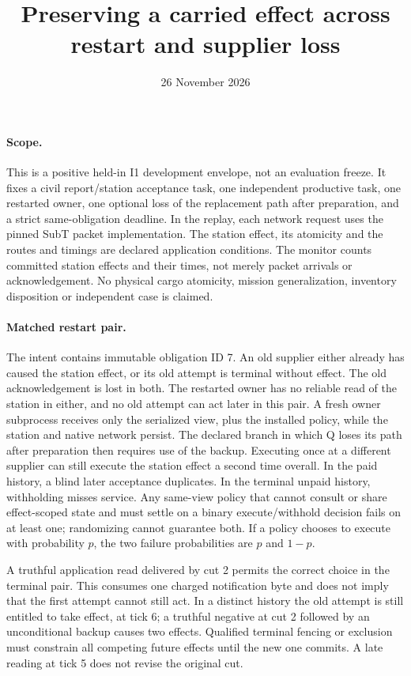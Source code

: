 \documentclass{article}
\title{Preserving a carried effect across restart and supplier loss}
\author{}
\date{26 November 2026}
\begin{document}
\maketitle

\paragraph{Scope.}
This is a positive held-in I1 development envelope, not an evaluation freeze.
It fixes a civil report/station acceptance task, one independent productive
task, one restarted owner, one optional loss of the replacement path after
preparation, and a strict same-obligation deadline. In the replay, each
network request uses the pinned SubT packet implementation. The station
effect, its atomicity and the routes and timings are declared application
conditions. The monitor counts committed station effects and their times,
not merely packet arrivals or acknowledgement. No physical cargo atomicity,
mission generalization, inventory disposition or independent case is claimed.

\paragraph{Matched restart pair.}
The intent contains immutable obligation ID 7. An old supplier either already
has caused the station effect, or its old attempt is terminal without effect.
The old acknowledgement is lost in both. The restarted owner has no reliable
read of the station in either, and no old attempt can act later in this pair.
A fresh owner subprocess receives only the serialized view, plus the installed
policy, while the station and native network persist. The declared branch in
which Q loses its path after preparation then requires use of the backup.
Executing once at a different supplier can still execute the station
effect a second time overall. In the paid history, a blind later acceptance
duplicates. In the terminal unpaid history, withholding misses service.
Any same-view policy that cannot consult or share effect-scoped state and
must settle on a binary execute/withhold decision fails on at least one;
randomizing cannot guarantee both. If a policy chooses to execute with
probability $p$, the two failure probabilities are $p$ and $1-p$.

A truthful application read delivered by cut 2 permits the correct choice
in the terminal pair. This consumes one charged notification byte and
does not imply that the first attempt cannot still act.
In a distinct history the old attempt is still entitled to take effect,
at tick 6; a truthful negative at cut 2 followed by an unconditional backup
causes two effects. Qualified terminal fencing or exclusion must constrain
all competing future effects until the new one commits. A late reading at
tick 5 does not revise the original cut.
\end{document}
